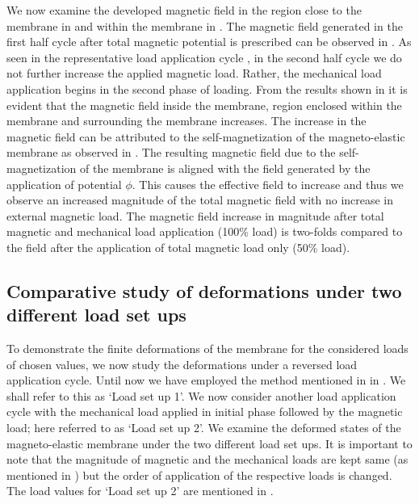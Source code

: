 We now examine the developed magnetic field in the region close to the membrane in  and within the membrane in . The magnetic field generated in the first half cycle after total magnetic potential is prescribed can be observed in . As seen in the representative load application cycle , in the second half cycle we do not further increase the applied magnetic load. Rather, the mechanical load application begins in the second phase of loading. From the results shown in  it is evident that the magnetic field inside the membrane, region enclosed within the membrane and surrounding the membrane increases. The increase in the magnetic field can be attributed to the self-magnetization of the magneto-elastic membrane as observed in . The resulting magnetic field due to the self-magnetization of the membrane is aligned with the field generated by the application of potential $\phi$. This causes the effective field to increase and thus we observe an increased magnitude of the total magnetic field with no increase in external magnetic load. The magnetic field increase in magnitude after total magnetic and mechanical load application (100\% load) is two-folds compared to the field after the application of total magnetic load only (50\% load). \par 

\subsection{Comparative study of deformations under two different load set ups}

To demonstrate the finite deformations of the membrane for the considered loads of chosen values, we now study the deformations under a reversed load application cycle. Until now we have employed the method mentioned in  in . We shall refer to this as `Load set up 1'. We now consider another load application cycle with the mechanical load applied in initial phase followed by the magnetic load; here referred to as `Load set up 2'. We examine the deformed states of the magneto-elastic membrane under the two different load set ups. It is important to note that the magnitude of magnetic and the mechanical loads are kept same (as mentioned in ) but the order of application of the respective loads is changed. The load values for `Load set up 2' are mentioned in . \par 


